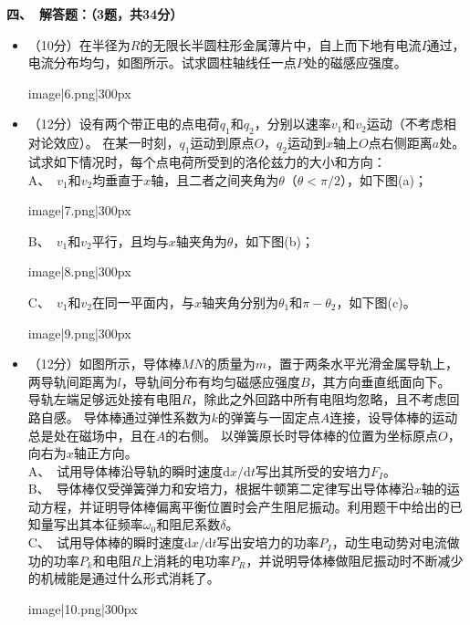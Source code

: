 \textbf{四、\ 解答题：（3题，共34分）}
\begin{itemize}
    \item[1、]（10分）在半径为$R$的无限长半圆柱形金属薄片中，自上而下地有电流$I$通过，电流分布均匀，如图所示。试求圆柱轴线任一点$P$处的磁感应强度。
    \begin{center}
        {{image|6.png|300px}}
    \end{center}
    \item[2、]（12分）设有两个带正电的点电荷$q_1$和$q_2$，分别以速率$v_1$和$v_2$运动（不考虑相对论效应）。
    在某一时刻，$q_1$运动到原点$O$，$q_2$运动到$x$轴上$O$点右侧距离$a$处。试求如下情况时，每个点电荷所受到的洛伦兹力的大小和方向：\\
    A、\ $v_1$和$v_2$均垂直于$x$轴，且二者之间夹角为$\theta$（$\theta<\pi/2$），如下图(a)；
    \begin{center}
        {{image|7.png|300px}}
    \end{center}
    B、\ $v_1$和$v_2$平行，且均与$x$轴夹角为$\theta$，如下图(b)；
    \begin{center}
        {{image|8.png|300px}}
    \end{center}
    C、\ $v_1$和$v_2$在同一平面内，与$x$轴夹角分别为$\theta_1$和$\pi - \theta_2$，如下图(c)。
    \begin{center}
        {{image|9.png|300px}}
    \end{center}
    \item[3、]（12分）如图所示，导体棒$MN$的质量为$m$，置于两条水平光滑金属导轨上，两导轨间距离为$l$，导轨间分布有均匀磁感应强度$B$，其方向垂直纸面向下。
    导轨左端足够远处接有电阻$R$，除此之外回路中所有电阻均忽略，且不考虑回路自感。
    导体棒通过弹性系数为$k$的弹簧与一固定点$A$连接，设导体棒的运动总是处在磁场中，且在$A$的右侧。
    以弹簧原长时导体棒的位置为坐标原点$O$，向右为$x$轴正方向。\\
    A、\ 试用导体棒沿导轨的瞬时速度$\mathrm{d}x/\mathrm{d}t$写出其所受的安培力$F_I$。\\
    B、\ 导体棒仅受弹簧弹力和安培力，根据牛顿第二定律写出导体棒沿$x$轴的运动方程，并证明导体棒偏离平衡位置时会产生阻尼振动。利用题干中给出的已知量写出其本征频率$\omega_0$和阻尼系数$\delta$。\\
    C、\ 试用导体棒的瞬时速度$\mathrm{d}x/\mathrm{d}t$写出安培力的功率$P_I$，动生电动势对电流做功的功率$P_k$和电阻$R$上消耗的电功率$P_R$，并说明导体棒做阻尼振动时不断减少的机械能是通过什么形式消耗了。
    \begin{center}
        {{image|10.png|300px}}
    \end{center}
\end{itemize}
